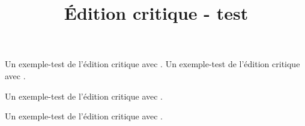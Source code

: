 \documentclass{book}
\title{Édition critique - test}
\author{}
\begin{document}
\beginnumbering
\pstart
Un exemple-test de l'édition critique avec . Un exemple-test de l'édition critique avec .

Un exemple-test de l'édition critique avec .

Un exemple-test de l'édition critique avec .
\pend
\endnumbering
\end{document}
